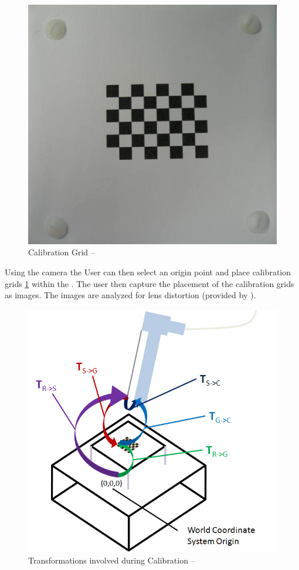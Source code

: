 \documentclass[11pt]{report}
\begin{document}
\begin{figure}[htp]
\centering
\includegraphics[scale=0.45]{images/board.png}
\caption{Calibration Grid --\cite{CC}}
\label{fig:grid}
\end{figure}

Using the camera the User can then select an origin point and place calibration grids \ref{fig:grid} within the . The user then capture the placement of the calibration grids as images.
The images are analyzed for lens distortion (provided by ). 


\begin{figure}[htp]
\centering
\includegraphics[scale=0.45]{images/Coordinates.png}
\caption{Transformations involved during Calibration --\cite{CC}}
\label{fig:coord}
\end{figure}
\end{document}
